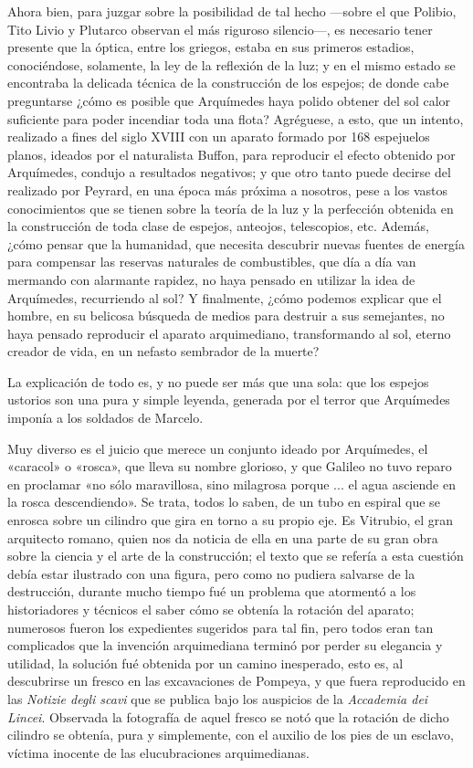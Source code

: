\documentclass[a4paper, 12pt, draft]{article}
\begin{document}
{Ahora bien, para juzgar sobre la posibilidad de tal hecho ---sobre el que Polibio, Tito Livio y Plutarco observan el más riguroso silencio---, es necesario tener presente que la óptica, entre los griegos, estaba en sus primeros estadios, conociéndose, solamente, la ley de la reflexión de la luz; y en el mismo estado se encontraba la delicada técnica de la construcción de los espejos; de donde cabe preguntarse ¿cómo es posible que Arquímedes haya polido obtener del sol calor suficiente para poder incendiar toda una flota? Agréguese, a esto, que un intento, realizado a fines del siglo XVIII con un aparato formado por 168 espejuelos planos, ideados por el	naturalista Buffon, para reproducir el efecto obtenido por Arquímedes, condujo a resultados negativos; y que otro tanto puede decirse del realizado por Peyrard, en una época más próxima a nosotros, pese a los vastos conocimientos que se tienen sobre la teoría de la luz y la perfección obtenida en la construcción de toda clase de espejos, anteojos, telescopios, etc. Además, ¿cómo pensar que la humanidad, que necesita descubrir nuevas fuentes de energía para compensar las reservas naturales de combustibles, que día a día van mermando con alarmante rapidez, no haya pensado en utilizar la idea de Arquímedes, recurriendo al sol? Y finalmente, ¿cómo podemos explicar que el hombre, en su belicosa búsqueda de medios para destruir a sus semejantes, no haya pensado reproducir el aparato arquimediano, transformando al sol, eterno creador de vida, en un nefasto sembrador de la muerte?

La explicación de todo es, y no puede ser más que una sola: que los espejos ustorios son una pura y simple leyenda, generada por el terror que Arquímedes imponía a los soldados de Marcelo.

Muy diverso es el juicio que merece un conjunto ideado por Arquímedes, el «caracol» o «rosca», que lleva su nombre glorioso, y que Galileo no tuvo reparo en proclamar «no sólo maravillosa, sino milagrosa porque ...  el agua asciende en la rosca descendiendo». Se trata, todos lo saben, de un tubo
en espiral que se enrosca sobre un cilindro que gira en torno a su propio eje. Es Vitrubio, el gran arquitecto romano, quien nos da noticia de ella en una parte de su gran obra sobre la ciencia y el arte de la construcción; el texto que se refería a esta cuestión debía estar ilustrado con una figura, pero como no pudiera salvarse de la destrucción, durante mucho tiempo fué un problema que atormentó a los historiadores y técnicos el saber cómo se obtenía la rotación del aparato; numerosos fueron los expedientes sugeridos para tal fin, pero todos eran tan complicados que la invención arquimediana terminó por perder su elegancia y utilidad, la solución fué obtenida por un camino inesperado, esto es, al descubrirse un fresco en las excavaciones de Pompeya, y que fuera reproducido en las \textit{ Notizie degli scavi} que se publica bajo los auspicios de la \textit{ Accademia dei Lincei}. Observada la fotografía de aquel fresco se notó que la rotación de dicho cilindro se obtenía, pura y simplemente, con el auxilio de los pies de un esclavo, víctima inocente de las elucubraciones arquimedianas.


}
\end{document}

